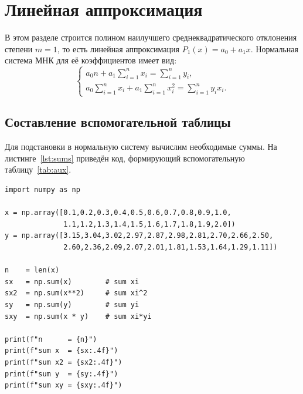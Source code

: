 \section{Линейная аппроксимация}

В этом разделе строится полином наилучшего среднеквадратического отклонения
степени $m = 1$, то есть линейная аппроксимация $P_1(x) = a_0 + a_1 x$.
Нормальная система МНК для её коэффициентов имеет вид:
\[
\begin{cases}
a_0 n + a_1 \displaystyle\sum_{i=1}^{n} x_i = \sum_{i=1}^{n} y_i, \\[6pt]
a_0 \displaystyle\sum_{i=1}^{n} x_i + a_1 \sum_{i=1}^{n} x_i^2 = \sum_{i=1}^{n} y_i x_i.
\end{cases}
\]

\subsection{Составление вспомогательной таблицы}

Для подстановки в нормальную систему вычислим необходимые суммы.
На листинге~\ref{lst:sums} приведён код, формирующий вспомогательную
таблицу~\ref{tab:aux}.

\begin{lstlisting}[caption={Вычисление вспомогательных сумм}, label=lst:sums]
import numpy as np

x = np.array([0.1,0.2,0.3,0.4,0.5,0.6,0.7,0.8,0.9,1.0,
              1.1,1.2,1.3,1.4,1.5,1.6,1.7,1.8,1.9,2.0])
y = np.array([3.15,3.04,3.02,2.97,2.87,2.98,2.81,2.70,2.66,2.50,
              2.60,2.36,2.09,2.07,2.01,1.81,1.53,1.64,1.29,1.11])

n    = len(x)
sx   = np.sum(x)        # sum xi
sx2  = np.sum(x**2)     # sum xi^2
sy   = np.sum(y)        # sum yi
sxy  = np.sum(x * y)    # sum xi*yi

print(f"n      = {n}")
print(f"sum x  = {sx:.4f}")
print(f"sum x2 = {sx2:.4f}")
print(f"sum y  = {sy:.4f}")
print(f"sum xy = {sxy:.4f}")
\end{lstlisting}

